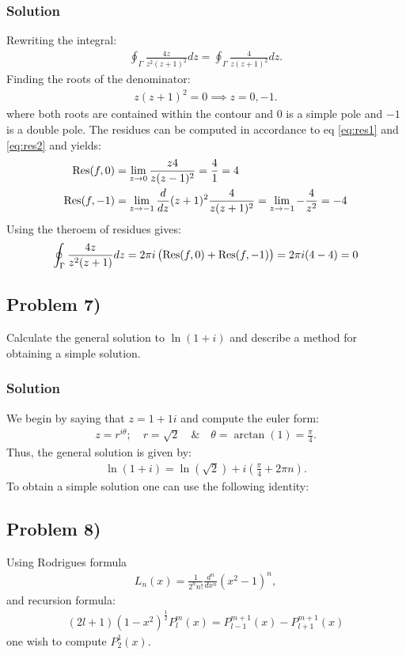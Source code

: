 \subsubsection*{Solution}
Rewriting the integral:
\begin{align*}
    \oint_\Gamma\frac{4z}{z^2(z + 1)^2}dz = \oint_\Gamma\frac{4}{z(z+1)^2}dz.
\end{align*}Finding the roots of the denominator:
\begin{align*}
    z(z + 1)^2 = 0 \implies z = 0, -1.
\end{align*}where both roots are contained within the contour and $0$ is a simple pole and $-1$ is a double pole. The residues can be computed in accordance to eq \eqref{eq:res1} and \eqref{eq:res2} and yields:
\begin{align*}
    \text{Res}(f,0) &= \lim_{z\to0}\frac{z4}{z(z-1)^2} = \frac{4}{1} = 4\\
    \text{Res}(f,-1) &=\lim_{z\to -1} \frac{d}{dz}(z + 1)^2\frac{4}{z(z+1)^2} = \lim_{z\to-1}-\frac{4}{z^2}= -4
\end{align*}Using the theroem of residues gives:
\begin{align*}
    \oint_\Gamma\frac{4z}{z^2(z+1)}dz = 2\pi i\left(\text{Res}(f,0) + \text{Res}(f,-1)\right) = 2\pi i(4 - 4) = 0
\end{align*}

\subsection*{Problem 7)}
Calculate the general solution to $\ln(1 + i)$ and describe a method for obtaining a simple solution.

\subsubsection*{Solution}
We begin by saying that $z = 1 + 1i$ and compute the euler form:
\begin{align*}
    z = r^{i\theta};\quad  r = \sqrt{2}\quad  \& \quad \theta = \arctan(1) = \frac{\pi}{4}.
\end{align*}
Thus, the general solution is given by:
\begin{align*}
    \ln(1 + i) = \ln(\sqrt{2}) + i\left(\frac{\pi}{4} + 2\pi n\right).
\end{align*}To obtain a simple solution one can use the following identity:

\subsection*{Problem 8)}
Using Rodrigues formula
\begin{align*}
    L_n(x) = \frac{1}{2^nn!}\frac{d^n}{dx^n}(x^2-1)^n,
\end{align*}and recursion formula:
\begin{align}
    (2l +  1)(1-x^2)^{\frac{1}{2}}P_{l}^m(x) = P_{l - 1}^{m + 1}(x) - P_{l + 1}^{m + 1}(x) \label{eq: recursion}
\end{align}one wish to compute $P_2^1(x)$. 

